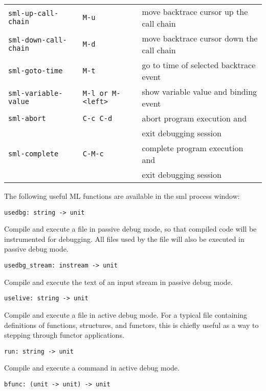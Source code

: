 \begin{center}
\begin{tabular}{|lll|}
\verb'sml-up-call-chain' & \verb'M-u' &
	move backtrace cursor up the call chain \\
\verb'sml-down-call-chain' & \verb'M-d' &
	move backtrace cursor down the call chain \\
\verb'sml-goto-time' & \verb'M-t' & go to time of selected backtrace event \\
\verb'sml-variable-value' & \verb'M-l or M-<left>' &
	show variable value and binding event \\
\verb'sml-abort' & \verb'C-c C-d' &
	abort program execution and \\
    & & exit debugging session \\
\verb'sml-complete' & \verb'C-M-c' & 
	complete program execution and \\
    & & exit debugging session \\
\hline
\end{tabular}
\end{center}

The following useful ML functions are available in the sml process window:

\begin{verbatim}
usedbg: string -> unit
\end{verbatim}

Compile and execute a file in passive debug mode, so that compiled
code will be instrumented for debugging.  All files used by
the file will also be executed in passive debug mode.

\begin{verbatim}
usedbg_stream: instream -> unit
\end{verbatim}

Compile and execute the text of an input stream in passive debug mode.

\begin{verbatim}
uselive: string -> unit
\end{verbatim}

Compile and execute a file in active debug mode.  For a typical file
containing definitions of functions, structures, and functors, this
is chiefly useful as a way to stepping through functor applications.

\begin{verbatim}
run: string -> unit
\end{verbatim}

Compile and execute a command in active debug mode.

\begin{verbatim}
bfunc: (unit -> unit) -> unit
\end{verbatim}

